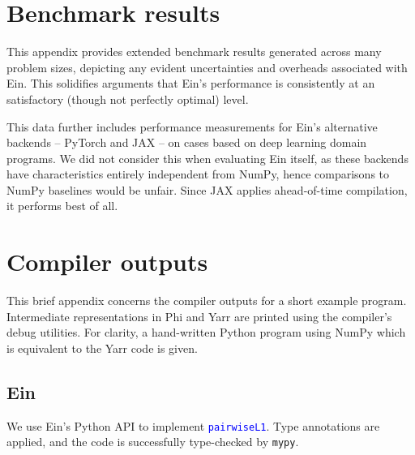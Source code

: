 \chapter{Benchmark results}

This appendix provides extended benchmark results generated across many problem sizes, depicting any evident uncertainties and overheads associated with Ein. This solidifies arguments that Ein's performance is consistently at an satisfactory (though not perfectly optimal) level. 

This data further includes performance measurements for Ein's alternative backends -- PyTorch and JAX -- on cases based on deep learning domain programs. We did not consider this when evaluating Ein itself, as these backends have characteristics entirely independent from NumPy, hence comparisons to NumPy baselines would be unfair. Since JAX applies ahead-of-time compilation, it performs best of all.


\pgfplotsset{width=0.46\textwidth}
\begin{center}


\end{center}
\begin{center}


\end{center}
\begin{center}


\end{center}
\begin{center}


\end{center}

\chapter{Compiler outputs}

This brief appendix concerns the compiler outputs for a short example program. Intermediate representations in Phi and Yarr are printed using the compiler's debug utilities. For clarity, a hand-written Python program using NumPy which is equivalent to the Yarr code is given.

\section*{Ein}

We use Ein's Python API to implement \textcolor{blue}{\texttt{pairwiseL1}}. Type annotations are applied, and the code is successfully type-checked by \texttt{mypy}.


